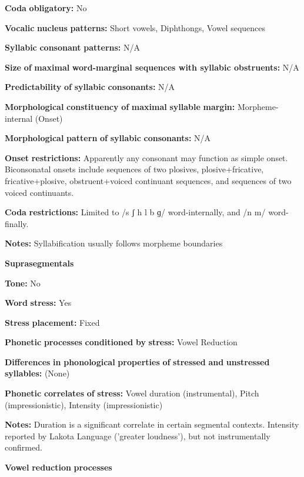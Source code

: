 \textbf{Coda} \textbf{obligatory:} No

\textbf{Vocalic} \textbf{nucleus} \textbf{patterns:} Short vowels, Diphthongs, Vowel sequences

\textbf{Syllabic} \textbf{consonant} \textbf{patterns:} N/A

\textbf{Size} \textbf{of} \textbf{maximal} \textbf{word{}-marginal sequences with syllabic obstruents:} N/A

\textbf{Predictability} \textbf{of} \textbf{syllabic} \textbf{consonants:} N/A

\textbf{Morphological} \textbf{constituency} \textbf{of} \textbf{maximal} \textbf{syllable} \textbf{margin:} Morpheme-internal (Onset)

\textbf{Morphological} \textbf{pattern} \textbf{of} \textbf{syllabic} \textbf{consonants:} N/A

\textbf{Onset} \textbf{restrictions:} Apparently any consonant may function as simple onset. Biconsonatal onsets include sequences of two plosives, plosive+fricative, fricative+plosive, obstruent+voiced continuant sequences, and sequences of two voiced continuants.

\textbf{Coda} \textbf{restrictions:} Limited to /s ʃ h l b ɡ/ word-internally, and /n m/ word-finally.

\textbf{Notes:} Syllabification usually follows morpheme boundaries

\textbf{Suprasegmentals}

\textbf{Tone:} No

\textbf{Word} \textbf{stress:} Yes

\textbf{Stress} \textbf{placement:} Fixed

\textbf{Phonetic} \textbf{processes} \textbf{conditioned} \textbf{by} \textbf{stress:} Vowel Reduction

\textbf{Differences} \textbf{in} \textbf{phonological} \textbf{properties} \textbf{of} \textbf{stressed} \textbf{and} \textbf{unstressed} \textbf{syllables:} (None)

\textbf{Phonetic} \textbf{correlates} \textbf{of} \textbf{stress:} Vowel duration (instrumental), Pitch (impressionistic), Intensity (impressionistic)

\textbf{Notes:} Duration is a significant correlate in certain segmental contexts. Intensity reported by Lakota Language \citet{Consortium2008} (’greater loudness’), but not instrumentally confirmed.

\textbf{Vowel} \textbf{reduction} \textbf{processes}

